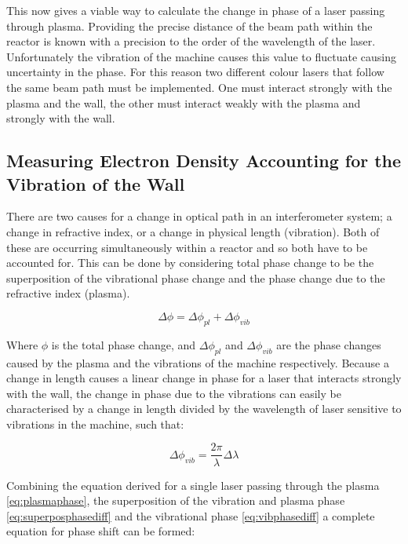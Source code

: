 \documentclass[12pt,a4paper,oneside]{report}
\begin{document}
This now gives a viable way to calculate the change in phase of a laser passing through plasma. Providing the precise distance of the beam path within the reactor is known with a precision to the order of the wavelength of the laser. Unfortunately the vibration of the machine causes this value to fluctuate causing uncertainty in the phase. For this reason two different colour lasers that follow the same beam path must be implemented. One must interact strongly with the plasma and the wall, the other must interact weakly with the plasma and strongly with the wall.
	
    
    \subsection{Measuring Electron Density Accounting for the Vibration of the Wall}
There are two causes for a change in optical path in an interferometer system; a change in refractive index, or a change in physical length (vibration). Both of these are occurring simultaneously within a reactor and so both have to be accounted for. This can be done by considering total phase change to be the superposition of the vibrational phase change and the phase change due to the refractive index (plasma).

\begin{equation}
	\Delta\phi = \Delta\phi_{pl} + \Delta\phi_{vib}
	\label{eq:superposphasediff}
\end{equation}

Where $\phi$ is the total phase change, and $\Delta\phi_{pl}$ and $\Delta\phi_{vib}$ are the phase changes caused by the plasma and the vibrations of the machine respectively. Because a change in length causes a linear change in phase for a laser that interacts strongly with the wall, the change in phase due to the vibrations can easily be characterised by a change in length divided by the wavelength of laser sensitive to vibrations in the machine, such that:

\begin{equation}
	\Delta\phi_{vib} = \frac{2\pi}{\lambda} \Delta\lambda
	\label{eq:vibphasediff}
\end{equation}

Combining the equation derived for a single laser passing through the plasma \ref{eq:plasmaphase}, the superposition of the vibration and plasma phase \ref{eq:superposphasediff} and the vibrational phase \ref{eq:vibphasediff} a complete equation for phase shift can be formed:
\end{document}
